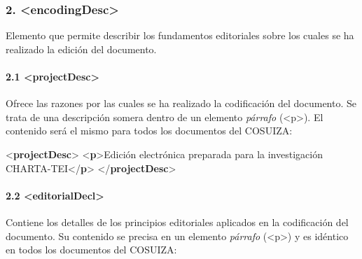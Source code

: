 \documentclass[
]{book}
\newenvironment{Shaded}{\begin{snugshade}}{\end{snugshade}}
\newcommand{\KeywordTok}[1]{\textcolor[rgb]{0.13,0.29,0.53}{\textbf{#1}}}
\newcommand{\NormalTok}[1]{#1}
\begin{document}
\hypertarget{encodingdesc}{%
\subsubsection*{\texorpdfstring{2. { \textless encodingDesc\textgreater{} }}{2.  \textless encodingDesc\textgreater{} }}\label{encodingdesc}}

Elemento que permite describir los fundamentos editoriales sobre los cuales se ha realizado la edición del documento.

\hypertarget{projectdesc}{%
\paragraph*{\texorpdfstring{2.1 { \textless projectDesc\textgreater{} }}{2.1  \textless projectDesc\textgreater{} }}\label{projectdesc}}

Ofrece las razones por las cuales se ha realizado la codificación del documento. Se trata de una descripción somera dentro de un elemento \emph{párrafo} ({\textless p\textgreater{}}). El contenido será el mismo para todos los documentos del COSUIZA:

\begin{Shaded}
\begin{Highlighting}[]
\NormalTok{\textless{}}\KeywordTok{projectDesc}\NormalTok{\textgreater{} }
\NormalTok{  \textless{}}\KeywordTok{p}\NormalTok{\textgreater{}Edición electrónica preparada para la investigación CHARTA{-}TEI\textless{}/}\KeywordTok{p}\NormalTok{\textgreater{}}
\NormalTok{\textless{}/}\KeywordTok{projectDesc}\NormalTok{\textgreater{}}
\end{Highlighting}
\end{Shaded}

\hypertarget{editorialdecl}{%
\paragraph*{\texorpdfstring{2.2 { \textless editorialDecl\textgreater{} }}{2.2  \textless editorialDecl\textgreater{} }}\label{editorialdecl}}

Contiene los detalles de los principios editoriales aplicados en la codificación del documento. Su contenido se precisa en un elemento \emph{párrafo} ({\textless p\textgreater{}}) y es idéntico en todos los documentos del COSUIZA:
\end{document}
